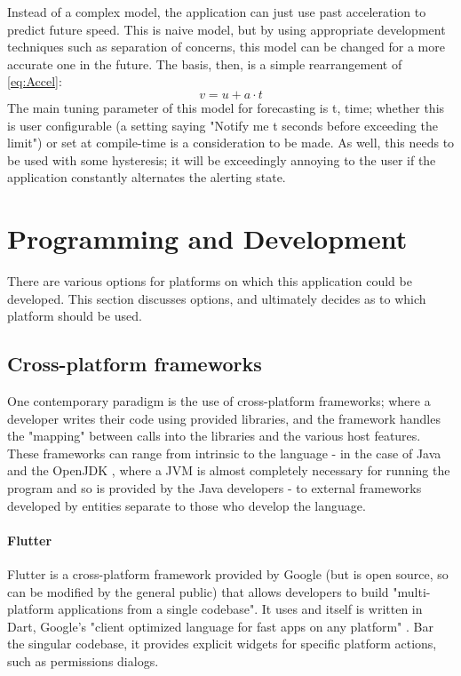 \documentclass[11pt, a4paper, notitlepage]{report}
\begin{document}
Instead of a complex model, the application can just use past acceleration to predict future speed. This is naive model, but by using appropriate development techniques such as separation of concerns, this model can be changed for a more accurate one in the future. The basis, then, is a simple rearrangement of \ref{eq:Accel}:
\begin{equation}
    v = u + a \cdot t
\end{equation}
The main tuning parameter of this model for forecasting is t, time; whether this is user configurable (a setting saying "Notify me t seconds before exceeding the limit") or set at compile-time is a consideration to be made. As well, this needs to be used with some hysteresis; it will be exceedingly annoying to the user if the application constantly alternates the alerting state.

\section{Programming and Development}
There are various options for platforms on which this application could be developed. This section discusses options, and ultimately decides as to which platform should be used.

\subsection{Cross-platform frameworks}
One contemporary paradigm is the use of cross-platform frameworks; where a developer writes their code using provided libraries, and the framework handles the "mapping" between calls into the libraries and the various host features. These frameworks can range from intrinsic to the language - in the case of Java and the OpenJDK \citep{openJdk}, where a JVM is almost completely necessary for running the program and so is provided by the Java developers - to external frameworks developed by entities separate to those who develop the language.

\paragraph{Flutter}
Flutter \citep{FlutterWebsite} is a cross-platform framework provided by Google (but is open source, so can be modified by the general public) that allows developers to build "multi-platform applications from a single codebase". It uses and itself is written in Dart, Google's "client optimized language for fast apps on any platform" \citep{dartWebsite}. Bar the singular codebase, it provides explicit widgets for specific platform actions, such as permissions dialogs.
\end{document}
